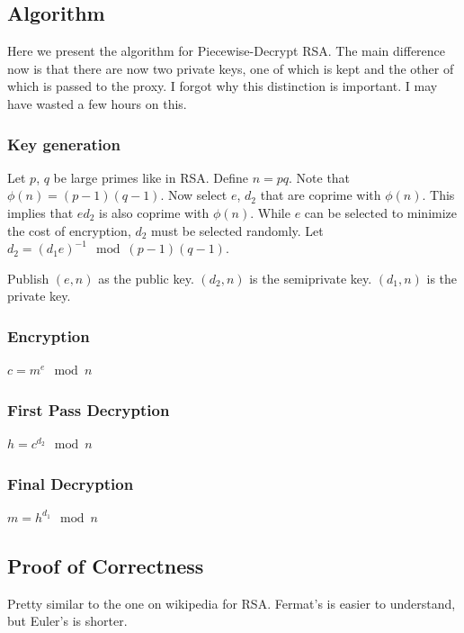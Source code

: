 \documentclass{article}
\begin{document}
\subsection{Algorithm}
Here we present the algorithm for Piecewise-Decrypt RSA.  The main difference now is that there are now two private keys, one of which is kept and the other of which is passed  to the proxy.  I forgot why this distinction is important.  I may have wasted a few hours on this.
\subsubsection{Key generation}
Let $p$, $q$ be large primes like in RSA. Define $n = pq$. Note that $\phi(n) = (p-1)(q-1)$. Now select $e$, $d_2$ that are coprime with $\phi(n)$.  This implies that $ed_2$ is also coprime with $\phi(n)$.  While $e$ can be selected to minimize the cost of encryption, $d_2$ must be selected randomly.  Let $d_2 = (d_1e)^{-1} \mod(p-1)(q-1)$.  

Publish $(e,n)$ as the public key.  $(d_2, n)$ is the semiprivate key.  $(d_1, n)$ is the private key. 
\subsubsection{Encryption}
$c = m^{e} \mod n$
\subsubsection{First Pass Decryption}
$h = c^{d_2} \mod n$
\subsubsection{Final Decryption}
$m = h^{d_1} \mod n$
\subsection{Proof of Correctness}
Pretty similar to the one on wikipedia for RSA.  Fermat's is easier to understand, but Euler's is shorter.
\end{document}

